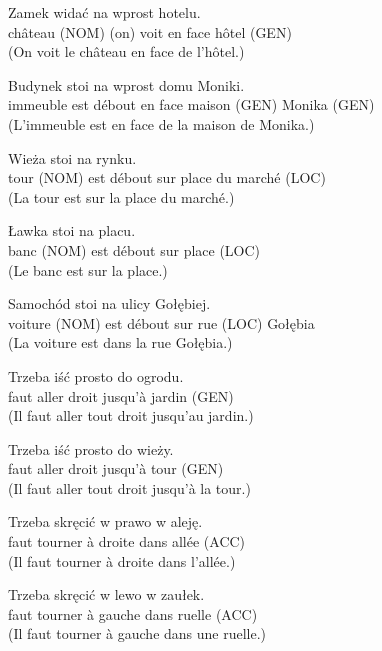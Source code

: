\documentclass[output=paper]{langscibook}
\begin{document}
\begin{otherlanguage}{french}
\begin{paperappendix}
\begin{exe}
\gll Zamek       widać     {na wprost}   hotelu.\\
      {château (NOM)} {(on) voit} {en face}     {hôtel (GEN)}\\
\glt (On voit le château en face de l’hôtel.)

\gll Budynek   {stoi}     {na wprost}   domu     Moniki. \\
      immeuble   {est débout} {en face}     {maison (GEN)} {Monika (GEN)}\\
\glt (L’immeuble est en face de la maison de Monika.)

\gll Wieża     stoi     na   {rynku.}\\
      {tour (NOM)} {est débout}   sur   {place du marché (LOC)}\\
\glt (La tour est sur la place du marché.)

\gll Ławka     stoi     na   placu.\\
      {banc (NOM)} {est débout} sur   {place (LOC)}\\
\glt (Le banc est sur la place.)

\gll Samochód     stoi     na   ulicy     Gołębiej.\\
     {voiture (NOM)}   {est débout}   sur   {rue (LOC)}   Gołębia\\
\glt (La voiture est dans la rue Gołębia.)
\end{exe}


\begin{exe}
\gll Trzeba   iść   prosto   do   ogrodu.\\
      faut     aller   droit   jusqu’à   {jardin (GEN)}\\
\glt (Il faut aller tout droit jusqu’au jardin.)

\gll Trzeba   iść   prosto   do   {wieży.}\\
      faut     aller   droit   jusqu’à {tour (GEN)}\\
\glt (Il faut aller tout droit jusqu’à la tour.)

\gll Trzeba   skręcić   w prawo   w   aleję.\\
      faut     tourner   à droite     dans   {allée (ACC)}\\
\glt (Il faut tourner à droite dans l’allée.)

\gll Trzeba   skręcić   w lewo     w   zaułek.\\
      faut     tourner   à gauche   dans   {ruelle (ACC)}\\
\glt (Il faut tourner à gauche dans une ruelle.)


\end{exe}
\end{paperappendix}
\end{otherlanguage}
\end{document}
